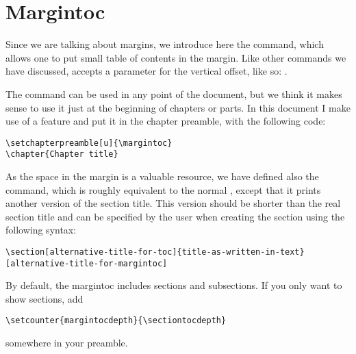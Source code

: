 \section{Margintoc}

Since we are talking about margins, we introduce here the 
 command, which allows one to put small table of 
contents in the margin. Like other commands we have discussed, 
 accepts a parameter for the vertical offset, like 
so: .

The command can be used in any point of the document, but we think it 
makes sense to use it just at the beginning of chapters or parts. In 
this document I make use of a \KOMAScript\xspace feature and put it in 
the chapter preamble, with the following code:


\begin{lstlisting}[style=kaolstplain]
\setchapterpreamble[u]{\margintoc}
\chapter{Chapter title}
\end{lstlisting}

As the space in the margin is a valuable resource, we have defined also 
the  command, which is roughly equivalent to the 
normal , except that it prints another version of the 
section title. This version should be shorter than the real section 
title and can be specified by the user when creating the section using 
the following syntax:

\begin{lstlisting}[style=kaolstplain]
\section[alternative-title-for-toc]{title-as-written-in-text}[alternative-title-for-margintoc]
\end{lstlisting}

By default, the margintoc includes sections and subsections.
If you only want to show sections, add
\begin{lstlisting}[style=kaolstplain]
\setcounter{margintocdepth}{\sectiontocdepth}
\end{lstlisting}
somewhere in your preamble.

